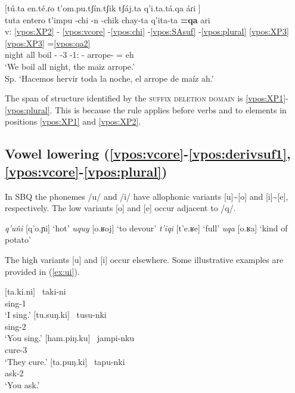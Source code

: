 \documentclass[output=paper]{langscibook}
\begin{document}
\ea \label{ex:qa.nodelete}
    [tú.ta en.té.ɾo t'om.pu.tʃín.tʃik tʃáj.ta q'i.ta.tá.qa áɾi \downarrow] \\
    \glll {} tuta entero t'impu -chi -n -chik chay-ta q'ita-ta \textbf{=qa} ari  \\
    v: \ref{vpos:XP2} - \ref{vpos:vcore} -\ref{vpos:chi} -\ref{vpos:SAsuf} -\ref{vpos:plural} \ref{vpos:XP3} \ref{vpos:XP3} =\ref{vpos:qa2} \\
    {} night all boil -\Caus{} -3 -1\Pl:\Incl{} \Dem{}-\Acc{} arrope-\Acc{} =\Top{} eh  \\
    \glt   `We boil all night, the maiz arrope.' \\ Sp. `Hacemos hervir toda la noche, el arrope de maíz ah.'
\z 

The span of structure identified by the \textsc{suffix deletion domain} is \ref{vpos:XP1}-\ref{vpos:plural}. This is because the rule applies before verbs and to elements in positions \ref{vpos:XP1} and \ref{vpos:XP2}.  


\subsection{Vowel lowering (\ref{vpos:vcore}-\ref{vpos:derivsuf1}, \ref{vpos:vcore}-\ref{vpos:plural})}
\label{sec:highvowelassimilation}

In SBQ the phonemes /u/ and /i/ have allophonic variants [u]\sim[o] and [i]\sim[e], respectively. The low variants [o] and [e] occur adjacent to /q/.

\ea \label{ex:oe} 
    \ea \textit{q'uñi} [q'o.ɲi] `hot'
    \ex \textit{uquy} [o.ʁoj] `to devour'
    \ex \textit{t'iqi} [t'e.ʁe] `full'
    \ex \textit{uqa} [o.ʁa] `kind of potato'
\z 
\z 

The high variants [u] and [i] occur elsewhere. Some illustrative examples are provided in (\ref{ex:ui}).

\ea \label{ex:ui}
    \ea 
    $[$ta.ki.ni$]$ \
    \gll taki-ni \\
    sing-1\Sg{} \\
    \glt `I sing.' 
    \ex
    $[$tu.suŋ.ki$]$ \
    \gll tusu-nki \\
    sing-2\Sg{} \\
    \glt `You sing.'
    \ex
    $[$ham.piŋ.ku$]$ \
    \gll jampi-nku \\
    cure-3\Pl{} \\
    \glt `They cure.'
    \ex 
    $[$ta.puŋ.ki$]$ \
    \gll tapu-nki \\
    ask-2\Sg{} \\
    \glt `You ask.'
    \z 
\z
\end{document}
